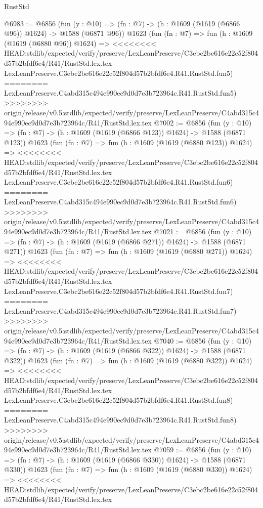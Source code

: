 \begin{lexlean}{RustStd}
\begin{coremodule}
{\begin{coremodule}
{{{{{{{{{{{{{{@6983 := @6856
    (fun (y : @10) => (fn : @7) -> (h : @1609 (@1619 (@6866 @96)) @1624) -> @1588 (@6871 @96))
    @1623
    (fun (fn : @7) =>
    fun (h : @1609 (@1619 (@6880 @96)) @1624) =>
<<<<<<<< HEAD:stdlib/expected/verify/preserve/LexLeanPreserve/C3ebc2be616e22c52f804d57b2bfdf6e4/R41/RustStd.lex.tex
    LexLeanPreserve.C3ebc2be616e22c52f804d57b2bfdf6e4.R41.RustStd.fun5)
========
    LexLeanPreserve.C4abd315c494e990ec9d0d7e3b723964c.R41.RustStd.fun5)
>>>>>>>> origin/release/v0.5:stdlib/expected/verify/preserve/LexLeanPreserve/C4abd315c494e990ec9d0d7e3b723964c/R41/RustStd.lex.tex
@7002 := @6856
    (fun (y : @10) => (fn : @7) -> (h : @1609 (@1619 (@6866 @123)) @1624) -> @1588 (@6871 @123))
    @1623
    (fun (fn : @7) =>
    fun (h : @1609 (@1619 (@6880 @123)) @1624) =>
<<<<<<<< HEAD:stdlib/expected/verify/preserve/LexLeanPreserve/C3ebc2be616e22c52f804d57b2bfdf6e4/R41/RustStd.lex.tex
    LexLeanPreserve.C3ebc2be616e22c52f804d57b2bfdf6e4.R41.RustStd.fun6)
========
    LexLeanPreserve.C4abd315c494e990ec9d0d7e3b723964c.R41.RustStd.fun6)
>>>>>>>> origin/release/v0.5:stdlib/expected/verify/preserve/LexLeanPreserve/C4abd315c494e990ec9d0d7e3b723964c/R41/RustStd.lex.tex
@7021 := @6856
    (fun (y : @10) => (fn : @7) -> (h : @1609 (@1619 (@6866 @271)) @1624) -> @1588 (@6871 @271))
    @1623
    (fun (fn : @7) =>
    fun (h : @1609 (@1619 (@6880 @271)) @1624) =>
<<<<<<<< HEAD:stdlib/expected/verify/preserve/LexLeanPreserve/C3ebc2be616e22c52f804d57b2bfdf6e4/R41/RustStd.lex.tex
    LexLeanPreserve.C3ebc2be616e22c52f804d57b2bfdf6e4.R41.RustStd.fun7)
========
    LexLeanPreserve.C4abd315c494e990ec9d0d7e3b723964c.R41.RustStd.fun7)
>>>>>>>> origin/release/v0.5:stdlib/expected/verify/preserve/LexLeanPreserve/C4abd315c494e990ec9d0d7e3b723964c/R41/RustStd.lex.tex
@7040 := @6856
    (fun (y : @10) => (fn : @7) -> (h : @1609 (@1619 (@6866 @322)) @1624) -> @1588 (@6871 @322))
    @1623
    (fun (fn : @7) =>
    fun (h : @1609 (@1619 (@6880 @322)) @1624) =>
<<<<<<<< HEAD:stdlib/expected/verify/preserve/LexLeanPreserve/C3ebc2be616e22c52f804d57b2bfdf6e4/R41/RustStd.lex.tex
    LexLeanPreserve.C3ebc2be616e22c52f804d57b2bfdf6e4.R41.RustStd.fun8)
========
    LexLeanPreserve.C4abd315c494e990ec9d0d7e3b723964c.R41.RustStd.fun8)
>>>>>>>> origin/release/v0.5:stdlib/expected/verify/preserve/LexLeanPreserve/C4abd315c494e990ec9d0d7e3b723964c/R41/RustStd.lex.tex
@7059 := @6856
    (fun (y : @10) => (fn : @7) -> (h : @1609 (@1619 (@6866 @330)) @1624) -> @1588 (@6871 @330))
    @1623
    (fun (fn : @7) =>
    fun (h : @1609 (@1619 (@6880 @330)) @1624) =>
<<<<<<<< HEAD:stdlib/expected/verify/preserve/LexLeanPreserve/C3ebc2be616e22c52f804d57b2bfdf6e4/R41/RustStd.lex.tex
}}}}}}}}}}}}}}
\end{coremodule}}
\end{coremodule}
\end{lexlean}
